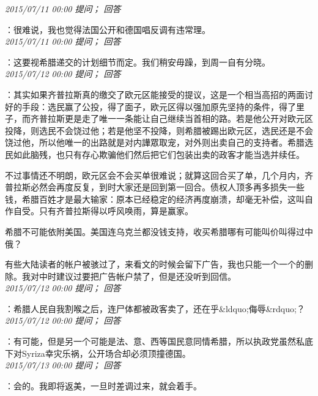 \documentclass[twocolumn]{ctexart}
\begin{document}
\textit{\hfill\noindent\small 2015/07/11 00:00 提问； 回答}

：很难说，我也觉得法国公开和德国唱反调有违常理。\\

\textit{\hfill\noindent\small 2015/07/11 00:00 提问； 回答}

：这要视希腊递交的计划细节而定。我们稍安毋躁，到周一自有分晓。\\

\textit{\hfill\noindent\small 2015/07/12 00:00 提问； 回答}

：其实如果齐普拉斯真的缴交了欧元区能接受的提议，这是一个相当高招的两面讨好的手段：选民赢了公投，得了面子，欧元区得以强加原先坚持的条件，得了里子，而齐普拉斯更是走了唯一一条能让自己继续当首相的路。若是他公开对欧元区投降，则选民不会饶过他；若是他坚不投降，则希腊被踢出欧元区，选民还是不会饶过他，所以他唯一的出路就是对内譁眾取宠，对外则出卖自己的支持者。希腊选民如此脑残，也只有存心欺骗他们然后把它们包装出卖的政客才能当选并续任。

不过事情还不明朗，欧元区会不会买单很难说；就算这回合买了单，几个月内，齐普拉斯必然会再度反复，到时大家还是回到第一回合。债权人顶多再多损失一些钱，希腊百姓才是最大输家：原本已经稳定的经济再度崩溃，却毫无补偿，这叫自作自受。只有齐普拉斯得以呼风唤雨，算是赢家。

希腊不可能依附美国。美国连乌克兰都没钱支持，收买希腊哪有可能叫价叫得过中俄？

有些大陆读者的帐户被骇过了，来看文的时候会留下广告，我也只能一个一个的删除。我对中时建议过要把广告帐户禁了，但是还没听到回信。\\

\textit{\hfill\noindent\small 2015/07/12 00:00 提问； 回答}

：希腊人民自我割喉之后，连尸体都被政客卖了，还在乎\&ldquo;侮辱\&rdquo;？\\

\textit{\hfill\noindent\small 2015/07/12 00:00 提问； 回答}

：有可能，但是另一个可能是法、意、西等国民意同情希腊，所以执政党虽然私底下对Syriza幸灾乐祸，公开场合却必须顶撞德国。\\

\textit{\hfill\noindent\small 2015/07/13 00:00 提问； 回答}

：会的。我即将返美，一旦时差调过来，就会着手。\\
\end{document}
